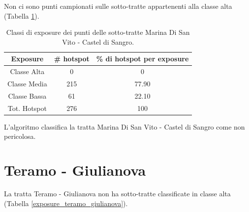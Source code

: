 Non ci sono punti campionati sulle sotto-tratte appartenenti alla classe alta (Tabella \ref{risultati_marina_sangro}).

\begin{table}[H]
	\centering
	\begin{tabular}{|c|c|c|}
		\hline
		\rowcolor[HTML]{C0C0C0} 
		\textbf{Exposure} & \textbf{\# hotspot} & \textbf{\% di hotspot per exposure} \\ \hline
		Classe Alta       & 0                  & 0                                   \\ \hline
		Classe Media      & 215                 & 77.90                             \\ \hline
		Classe Bassa      & 61              & 22.10                             \\ \hline
		Tot. Hotspot      & 276                & 100                                 \\ \hline
	\end{tabular}
	\caption{Classi di exposure dei punti delle sotto-tratte Marina Di San Vito - Castel di Sangro.}
	\label{risultati_marina_sangro}
\end{table}

L'algoritmo classifica la tratta Marina Di San Vito - Castel di Sangro come non pericolosa. 

\section{Teramo - Giulianova}
La tratta Teramo - Giulianova non ha sotto-tratte classificate in classe alta (Tabella \ref{exposure_teramo_giulianova}).

